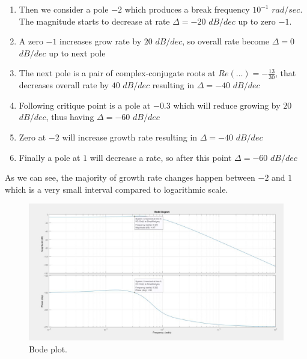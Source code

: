 \documentclass[12pt,letterpaper]{article}
\begin{document}
\begin{enumerate}[leftmargin=!,labelindent=5pt]
\begin{enumerate}
        \item Then we consider a pole $-2$ which produces a break frequency $10^{-1}$ $rad/sec$. The magnitude starts to decrease at rate $\Delta = -20$ $dB/dec$ up to zero $-1$.
        
        \item A zero $-1$ increases grow rate by $20$ $dB/dec$, so overall rate become $\Delta = 0$ $dB/dec$ up to next pole
        
        \item The next pole is a pair of complex-conjugate roots at $Re(\dots) = -\frac{13}{30}$, that decreases overall rate by $40$ $dB/dec$ resulting in $\Delta = -40$ $dB/dec$
        
        \item Following critique point is a pole at $-0.3$ which will reduce growing by $20$ $dB/dec$, thus having $\Delta = -60$ $dB/dec$
        
        \item Zero at $-2$ will increase growth rate resulting in $\Delta = -40$ $dB/dec$
        
        \item Finally a pole at $1$ will decrease a rate, so after this point $\Delta = - 60$ $dB/dec$
    \end{enumerate}
    As we can see, the majority of growth rate changes happen between $-2$ and $1$ which is a very small interval compared to logarithmic scale.
    
    \begin{figure}[H]
        \centering
        \includegraphics[width=15cm]{images/output/bode.jpg}
        \caption{Bode plot.}
        \label{fig:bode}
    \end{figure}
    
\end{enumerate}
\end{document}
